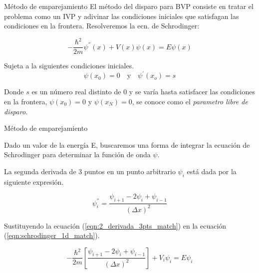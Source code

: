 \begin{frame}{Método de emparejamiento}
    El método del disparo para BVP  consiste en tratar el problema como un IVP y adivinar las condiciones iniciales que satisfagan las condiciones en la frontera. Resolveremos la ecn. de Schrodinger:

    \begin{equation}
        -\frac{\hbar^2}{2m} \psi^{''}(x) + V(x)\psi(x) = E\psi(x) 
        \label{eqn:schrodinger_1d_match}
    \end{equation}
    
    Sujeta a la siguientes condiciones iniciales.
    \begin{equation}
        \psi(x_0) = 0
        \quad \text{y} \quad
        \psi^{'}(x_o) = s
    \end{equation}

    Donde $s$ es un número real distinto de 0 y se varía hasta satisfacer las condiciones en la frontera, $\psi(x_0) = 0$ y $\psi(x_N) = 0$, se conoce como el \emph{parametro libre de disparo}.
\end{frame}

\begin{frame}{Método de emparejamiento}

    Dado un valor de la energía E, buscaremos una forma de integrar la ecuación de Schrodinger para determinar la función de onda $\psi$.
    
    \vspace{0.2cm}

    La segunda derivada de 3 puntos en un punto arbitrario $\psi_i$ está dada por la siguiente expresión.

    \begin{equation}
        \psi_{i}^{''} 
        =
        \frac{ \psi_{i+1} - 2\psi_{i} +  \psi_{i-1} }{ (\Delta x)^2 }
        \label{eqn:2_derivada_3pts_match}
    \end{equation}

    Sustituyendo la ecuación (\ref{eqn:2_derivada_3pts_match}) en la ecuación (\ref{eqn:schrodinger_1d_match}).

    \begin{equation}
        -\frac{\hbar^2}{2m} \left[ 
            \frac{ \psi_{i+1} - 2\psi_{i} +  \psi_{i-1} }{ (\Delta x)^2 }
         \right] + V_i\psi_i 
         = 
         E\psi_i 
         \label{eqn:discrete_schrodinger_matching}
    \end{equation}

\end{frame}

